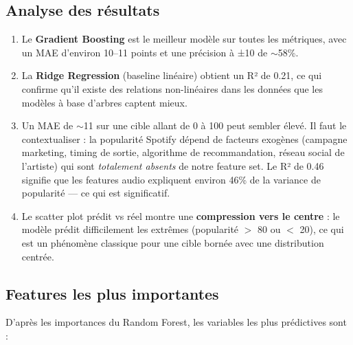 \documentclass[12pt, a4paper]{article}
\begin{document}
\subsection{Analyse des résultats}

\begin{enumerate}[leftmargin=1.5cm]
  \item Le \textbf{Gradient Boosting} est le meilleur modèle sur toutes les métriques,
        avec un MAE d'environ 10–11 points et une précision à ±10 de \(\sim\)58\%.

  \item La \textbf{Ridge Regression} (baseline linéaire) obtient un R² de 0.21,
        ce qui confirme qu'il existe des relations non-linéaires dans les données
        que les modèles à base d'arbres captent mieux.

  \item Un MAE de \(\sim\)11 sur une cible allant de 0 à 100 peut sembler élevé. Il faut
        le contextualiser : la popularité Spotify dépend de facteurs exogènes
        (campagne marketing, timing de sortie, algorithme de recommandation, réseau
        social de l'artiste) qui sont \textit{totalement absents} de notre feature set.
        Le R² de 0.46 signifie que les features audio expliquent environ 46\% de la
        variance de popularité — ce qui est significatif.

  \item Le scatter plot prédit vs réel montre une \textbf{compression vers le centre} :
        le modèle prédit difficilement les extrêmes (popularité $>$ 80 ou $<$ 20),
        ce qui est un phénomène classique pour une cible bornée avec une distribution
        centrée.
\end{enumerate}

\subsection{Features les plus importantes}

D'après les importances du Random Forest, les variables les plus prédictives sont :
\end{document}
